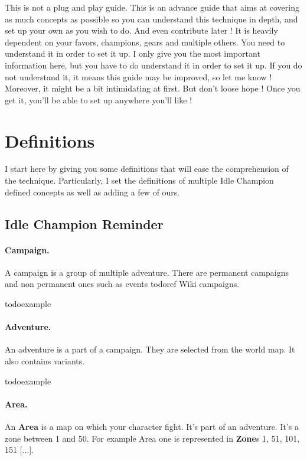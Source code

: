 \documentclass{article}
\begin{document}
This is not a plug and play guide.
This is an advance guide that aims at covering as much concepts as possible so you can understand this technique in depth, and set up your own as you wish to do.
And even contribute later !
It is heavily dependent on your favors, champions, gears and multiple others.
You need to understand it in order to set it up.
I only give you the most important information here, but you have to do understand it in order to set it up.
If you do not understand it, it means this guide may be improved, so let me know !
Moreover, it might be a bit intimidating at first.
But don't loose hope !
Once you get it, you'll be able to set up anywhere you'll like !


\section{Definitions}

I start here by giving you some definitions that will ease the comprehension of the technique.
Particularly, I set the definitions of multiple Idle Champion defined concepts as well as adding a few of ours.

\subsection{Idle Champion Reminder}

\paragraph{Campaign.}
A campaign is a group of multiple adventure.
There are permanent campaigns and non permanent ones such as events todoref Wiki campaigns.

todoexample

\paragraph{Adventure.}

An adventure is a part of a campaign.
They are selected from the world map.
It also contains variants.

todoexample

\paragraph{Area.}

An \textbf{Area} is a map on which your character fight.
It's part of an adventure.
It's a zone between 1 and 50.
For example Area one is represented in \textbf{Zone}s 1, 51, 101, 151 [...].
\end{document}
